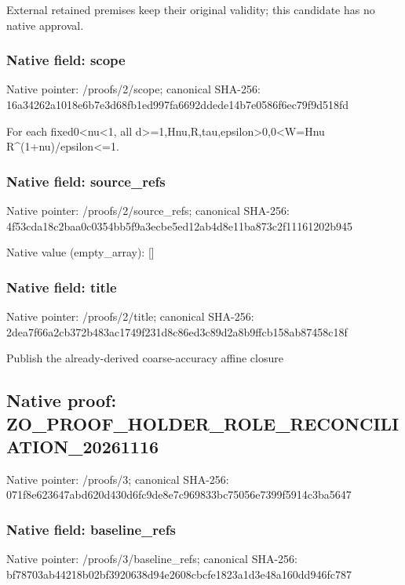 \documentclass[10pt,a4paper]{article}
\begin{document}
\begingroup\raggedright\sloppy External retained premises keep their original validity;\allowbreak{} this candidate has no native approval.\par\endgroup

\subsubsection{Native field: scope}
Native pointer: /proofs/2/scope; canonical SHA-256: 16a34262a1018e6b7e3d68fb1ed997fa6692ddede14b7e0586f6ec79f9d518fd

\begingroup\raggedright\sloppy For each fixed0<nu<1,\allowbreak{} all d>=\allowbreak{}1,\allowbreak{}Hnu,\allowbreak{}R,\allowbreak{}tau,\allowbreak{}epsilon>0,\allowbreak{}0<W=\allowbreak{}Hnu R\textasciicircum{}(1+nu)/\allowbreak{}epsilon<=\allowbreak{}1.\par\endgroup

\subsubsection{Native field: source\_\allowbreak{}refs}
Native pointer: /proofs/2/source\_\allowbreak{}refs; canonical SHA-256: 4f53cda18c2baa0c0354bb5f9a3ecbe5ed12ab4d8e11ba873c2f11161202b945

Native value (empty\_\allowbreak{}array): []

\subsubsection{Native field: title}
Native pointer: /proofs/2/title; canonical SHA-256: 2dea7f66a2cb372b483ac1749f231d8c86ed3c89d2a8b9ffcb158ab87458c18f

\begingroup\raggedright\sloppy Publish the already-derived coarse-accuracy affine closure\par\endgroup

\subsection{Native proof: ZO\_\allowbreak{}PROOF\_\allowbreak{}HOLDER\_\allowbreak{}ROLE\_\allowbreak{}RECONCILIATION\_\allowbreak{}20261116}
Native pointer: /proofs/3; canonical SHA-256: 071f8e623647abd620d430d6fc9de8e7c969833bc75056e7399f5914c3ba5647

\subsubsection{Native field: baseline\_\allowbreak{}refs}
Native pointer: /proofs/3/baseline\_\allowbreak{}refs; canonical SHA-256: bf78703ab44218b02bf3920638d94e2608cbcfe1823a1d3e48a160dd946fc787
\end{document}

